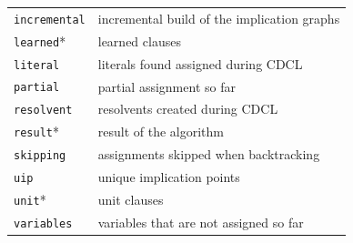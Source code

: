 \documentclass[11pt]{article}
\newcommand*{\p}[1]{\textup{\texttt{#1}}}
\begin{document}
\begin{center}
\begin{tabular}{|l|l|}
\p{incremental}& incremental build of the implication graphs\\
\p{learned}*  &  learned clauses                            \\
\p{literal}   &  literals found assigned during CDCL        \\
\p{partial}   &  partial assignment so far                  \\
\p{resolvent} &  resolvents created during CDCL             \\
\p{result}*   &  result of the algorithm                    \\
\p{skipping}  &  assignments skipped when backtracking      \\
\p{uip}       &  unique implication points                  \\
\p{unit}*     &  unit clauses                               \\
\p{variables} &  variables that are not assigned so far     \\
\hline
\end{tabular}
\end{center}
\end{document}

